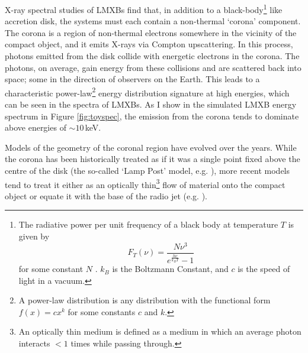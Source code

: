 \par X-ray spectral studies of LMXBs find that, in addition to a black-body\footnote{The radiative power per unit frequency of a black body at temperature $T$ is given by \[F_T(\nu)=\frac{N\nu^3}{e^\frac{h\nu}{k_BT}-1}\] for some constant $N$ \citep{Planck}.  $k_B$ is the Boltzmann Constant, and $c$ is the speed of light in a vacuum.} like accretion disk, the systems must each contain a non-thermal `corona' component.  The corona is a region of non-thermal electrons somewhere in the vicinity of the compact object, and it emits X-rays via Compton upscattering.  In this process, photons emitted from the disk collide with energetic electrons in the corona.  The photons, on average, gain energy from these collisions and are scattered back into space; some in the direction of observers on the Earth.  This leads to a characteristic power-law\footnote{A power-law distribution is any distribution with the functional form $f(x)=cx^k$ for some constants $c$ and $k$.} energy distribution signature at high energies, which can be seen in the spectra of LMXBs.  As I show in the simulated LMXB energy spectrum in Figure \ref{fig:toyspec}, the emission from the corona tends to dominate above energies of $\sim10$\,keV.
\par Models of the geometry of the coronal region have evolved over the years.  While the corona has been historically treated as if it was a single point fixed above the centre of the disk (the so-called `Lamp Post' model, e.g. \citealp{Rozanska_Lamppost}), more recent models tend to treat it either as an optically thin\footnote{An optically thin medium is defined as a medium in which an average photon interacts $<1$ times while passing through.} flow of material onto the compact object or equate it with the base of the radio jet (e.g. \citealp{Skipper_CoronaGeo}).


